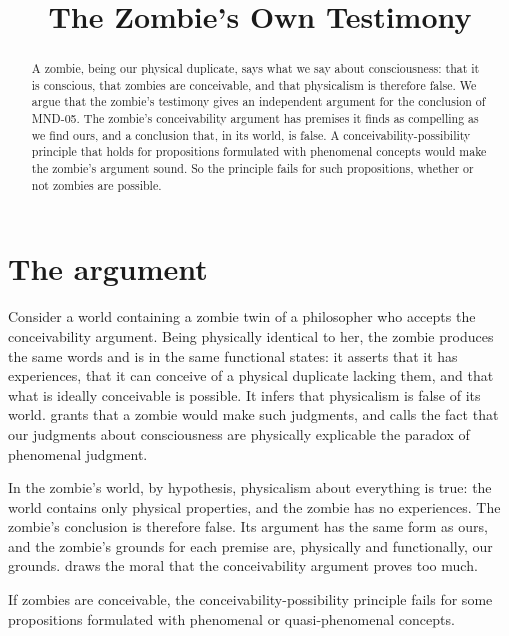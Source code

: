 \documentclass{situationist-preprint}
\title{The Zombie's Own Testimony}
\begin{document}
\maketitle

\begin{abstract}
A zombie, being our physical duplicate, says what we say about consciousness: that it is conscious, that zombies are conceivable, and that physicalism is therefore false. We argue that the zombie's testimony gives an independent argument for the conclusion of MND-05. The zombie's conceivability argument has premises it finds as compelling as we find ours, and a conclusion that, in its world, is false. A conceivability-possibility principle that holds for propositions formulated with phenomenal concepts would make the zombie's argument sound. So the principle fails for such propositions, whether or not zombies are possible.
\end{abstract}

\section{The argument}

Consider a world containing a zombie twin of a philosopher who accepts the conceivability argument. Being physically identical to her, the zombie produces the same words and is in the same functional states: it asserts that it has experiences, that it can conceive of a physical duplicate lacking them, and that what is ideally conceivable is possible. It infers that physicalism is false of its world. \citet{Chalmers1996} grants that a zombie would make such judgments, and calls the fact that our judgments about consciousness are physically explicable the paradox of phenomenal judgment.

In the zombie's world, by hypothesis, physicalism about everything is true: the world contains only physical properties, and the zombie has no experiences. The zombie's conclusion is therefore false. Its argument has the same form as ours, and the zombie's grounds for each premise are, physically and functionally, our grounds. \citet{Balog1999} draws the moral that the conceivability argument proves too much.

\begin{proposition}\label{p:fail}
If zombies are conceivable, the conceivability-possibility principle fails for some propositions formulated with phenomenal or quasi-phenomenal concepts.
\end{proposition}
\end{document}

